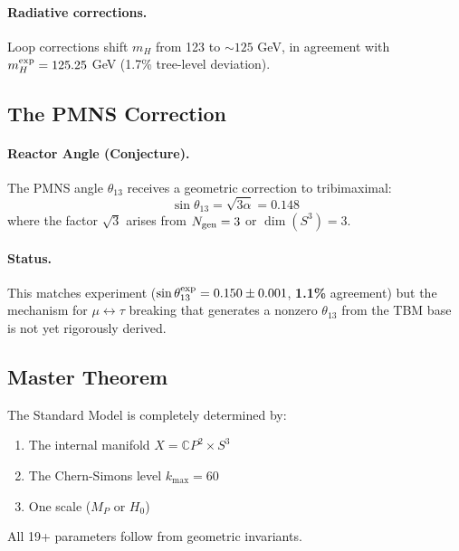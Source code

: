\paragraph{Radiative corrections.}
Loop corrections shift $m_H$ from 123 to $\sim 125$ GeV, in agreement with
$m_H^{\rm exp} = 125.25$ GeV (1.7\% tree-level deviation).

\subsection{The PMNS Correction}\label{app:pmns-z}

\paragraph{Reactor Angle (Conjecture).}
The PMNS angle $\theta_{13}$ receives a geometric correction to tribimaximal:
\begin{equation}
\sin\theta_{13} = \sqrt{3\alpha} = 0.148
\end{equation}
where the factor $\sqrt{3}$ arises from $N_{\rm gen} = 3$ or $\dim(S^3) = 3$.

\paragraph{Status.}
This matches experiment ($\sin\theta_{13}^{\rm exp} = 0.150 \pm 0.001$, \textbf{1.1\%} agreement)
but the mechanism for $\mu\leftrightarrow\tau$ breaking that generates a nonzero $\theta_{13}$ 
from the TBM base is not yet rigorously derived.

\subsection{Master Theorem}\label{app:master}

\begin{theorem}\label{thm:master}
The Standard Model is completely determined by:
\begin{enumerate}
\item The internal manifold $X = \mathbb{C}P^2 \times S^3$
\item The Chern-Simons level $k_{\max} = 60$
\item One scale ($M_P$ or $H_0$)
\end{enumerate}
All 19+ parameters follow from geometric invariants.
\end{theorem}

